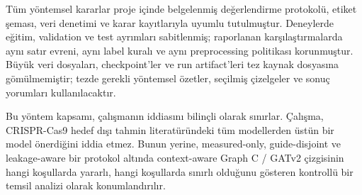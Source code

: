 Tüm yöntemsel kararlar proje içinde belgelenmiş değerlendirme protokolü, etiket şeması, veri denetimi ve karar kayıtlarıyla uyumlu tutulmuştur. Deneylerde eğitim, validation ve test ayrımları sabitlenmiş; raporlanan karşılaştırmalarda aynı satır evreni, aynı label kuralı ve aynı preprocessing politikası korunmuştur. Büyük veri dosyaları, checkpoint'ler ve run artifact'leri tez kaynak dosyasına gömülmemiştir; tezde gerekli yöntemsel özetler, seçilmiş çizelgeler ve sonuç yorumları kullanılacaktır.

Bu yöntem kapsamı, çalışmanın iddiasını bilinçli olarak sınırlar. Çalışma, CRISPR-Cas9 hedef dışı tahmin literatüründeki tüm modellerden üstün bir model önerdiğini iddia etmez. Bunun yerine, measured-only, guide-disjoint ve leakage-aware bir protokol altında context-aware Graph C / GATv2 çizgisinin hangi koşullarda yararlı, hangi koşullarda sınırlı olduğunu gösteren kontrollü bir temsil analizi olarak konumlandırılır.

